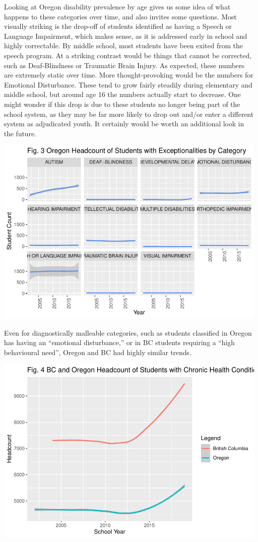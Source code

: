 \documentclass[
  english,
  man,floatsintext]{apa6}
\begin{document}
Looking at Oregon disability prevalence by age gives us some idea of what happens to these categories over time, and also invites some questions. Most visually striking is the drop-off of students identified as having a Speech or Language Impairment, which makes sense, as it is addressed early in school and highly correctable. By middle school, most students have been exited from the speech program. At a striking contrast would be things that cannot be corrected, such as Deaf-Blindness or Traumatic Brain Injury. As expected, these numbers are extremely static over time. More thought-provoking would be the numbers for Emotional Disturbance. These tend to grow fairly steadily during elementary and middle school, but around age 16 the numbers actually start to decrease. One might wonder if this drop is due to these students no longer being part of the school system, as they may be far more likely to drop out and/or enter a different system as adjudicated youth. It certainly would be worth an additional look in the future.

\includegraphics{Final_project_files/figure-latex/unnamed-chunk-1-1.pdf}

Even for diagnostically malleable categories, such as students classified in Oregon has having an \enquote{emotional disturbance,} or in BC students requiring a \enquote{high behavioural need}, Oregon and BC had highly similar trends.

\includegraphics{Final_project_files/figure-latex/BCOR combo-1.pdf}
\end{document}
